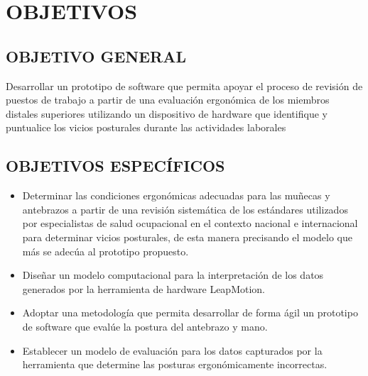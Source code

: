 \chapter{OBJETIVOS}
\section{OBJETIVO GENERAL}

Desarrollar un prototipo de software que permita apoyar el proceso de revisión de puestos de trabajo a partir de una evaluación ergonómica de los miembros distales superiores utilizando un dispositivo de hardware que identifique y puntualice los vicios posturales durante las actividades laborales
\section{OBJETIVOS ESPECÍFICOS}
\begin{itemize}
    \item Determinar las condiciones ergonómicas adecuadas para las muñecas y antebrazos a partir de una revisión sistemática de los estándares utilizados por especialistas de salud ocupacional en el contexto nacional e internacional para determinar vicios posturales, de esta manera precisando el modelo que más se adecúa al prototipo propuesto.
    \item Diseñar un modelo computacional para la interpretación de los datos generados por la herramienta de hardware LeapMotion.
    \item Adoptar una metodología que permita desarrollar de forma ágil un prototipo de software que evalúe la postura del antebrazo y mano. %
    \item Establecer un modelo de evaluación para los datos capturados por la herramienta que determine las posturas ergonómicamente incorrectas. 
\end{itemize}